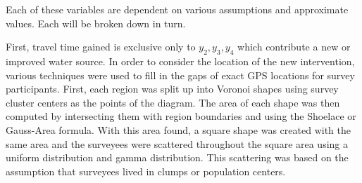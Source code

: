 Each of these variables are dependent on various assumptions and approximate values.
Each will be broken down in turn.

First, travel time gained is exclusive only to $y_2,y_3,y_4$ which contribute a new or improved water source.
In order to consider the location of the new intervention, various techniques were used to fill in the gaps of exact GPS locations for survey participants.
First, each region was split up into Voronoi shapes using survey cluster centers as the points of the diagram. %
The area of each shape was then computed by intersecting them with region boundaries and using the Shoelace or Gauss-Area formula. %
With this area found, a square shape was created with the same area and the surveyees were scattered throughout the square area using a uniform distribution and gamma distribution.
This scattering was based on the assumption that surveyees lived in clumps or population centers.
